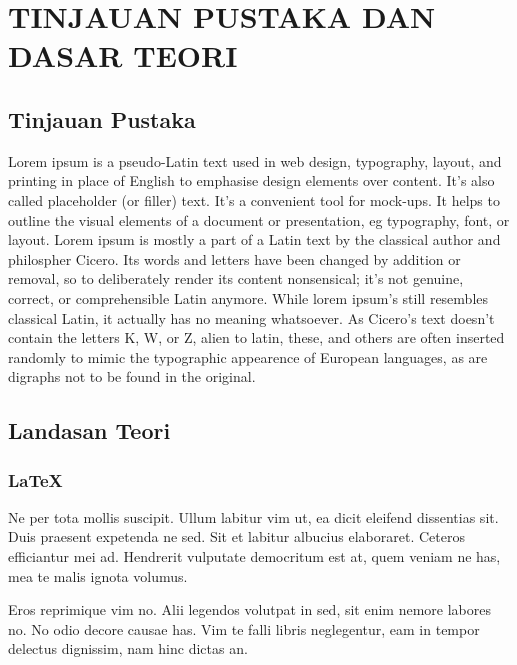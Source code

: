 
\chapter{TINJAUAN PUSTAKA DAN DASAR TEORI}                

\section{Tinjauan Pustaka}
  Lorem ipsum is a pseudo-Latin text used in web design, typography, layout, and printing in place of English to emphasise design elements over content. It's also called placeholder (or filler) text. It's a convenient tool for mock-ups. It helps to outline the visual elements of a document or presentation, eg typography, font, or layout. Lorem ipsum is mostly a part of a Latin text by the classical author and philospher Cicero. Its words and letters have been changed by addition or removal, so to deliberately render its content nonsensical; it's not genuine, correct, or comprehensible Latin anymore. While lorem ipsum's still resembles classical Latin, it actually has no meaning whatsoever. As Cicero's text doesn't contain the letters K, W, or Z, alien to latin, these, and others are often inserted randomly to mimic the typographic appearence of European languages, as are digraphs not to be found in the original. \cite{DaSilvaCampos2011}

\section{Landasan Teori}
  \subsection{\LaTeX}
    Ne per tota mollis suscipit. Ullum labitur vim ut, ea dicit eleifend dissentias sit. Duis praesent expetenda ne sed. Sit et labitur albucius elaboraret. Ceteros efficiantur mei ad. Hendrerit vulputate democritum est at, quem veniam ne has, mea te malis ignota volumus.

    Eros reprimique vim no. Alii legendos volutpat in sed, sit enim nemore labores no. No odio decore causae has. Vim te falli libris neglegentur, eam in tempor delectus dignissim, nam hinc dictas an.


